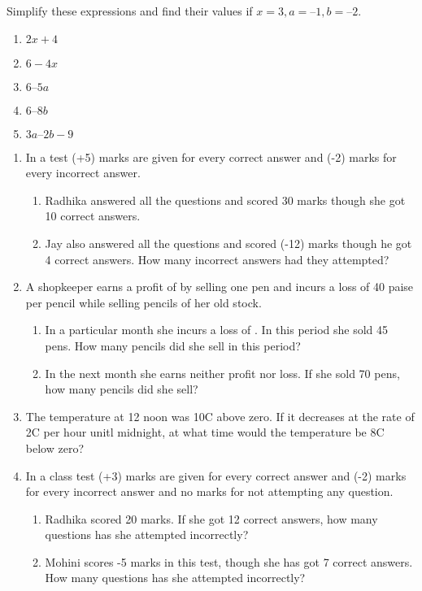 Simplify these expressions and find their values if $x = 3, a = – 1, b = – 2$. 
\begin{enumerate}[label=\thesubsection.\arabic*, ref=\thesubsection.\theenumi,resume*]
\item $ 2x +4 $
\item $6 - 4x$
\item $6 – 5a $
\item $6 – 8b $
\item $3a – 2b-9 $
\end{enumerate}
\begin{enumerate}[label=\thesubsection.\arabic*, ref=\thesubsection.\theenumi,resume*]
	\item In a test (+5) marks are given for every correct answer and (-2) marks for every incorrect answer.  
		\begin{enumerate}
			\item Radhika answered all the questions and scored 30 marks though she got 10 correct answers.
			\item Jay also answered all the questions and scored (-12) marks though he got 4 correct answers.  How many incorrect answers had they  attempted?
		\end{enumerate}
	\item A shopkeeper earns a profit of  by selling one pen and incurs a loss of 40 paise per pencil while selling pencils of her old stock.  
		\begin{enumerate}
			\item In a particular month she incurs a loss of .  In this period she sold 45 pens.  How many pencils did she sell in this period?
			\item In the next month she earns neither profit nor loss.  If she sold 70 pens, how many pencils did she sell?
		\end{enumerate}
			\item The temperature at 12 noon was 10\degree C above zero. If it decreases at the rate of 2\degree C per hour unitl midnight, at what time would the temperature be 8\degree C below zero? 
	\item In a class test (+3) marks are given for every correct answer and (-2) marks for every incorrect answer and no marks for not attempting any question.   
		\begin{enumerate}
			\item Radhika scored 20 marks.  If she got 12 correct answers, how many questions has she attempted incorrectly?
			\item Mohini scores -5 marks in this test, though she has got 7 correct answers.   How many questions has she attempted incorrectly?

\end{enumerate}
\end{enumerate}
